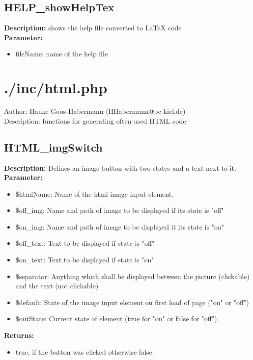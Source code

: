\subsection{HELP\_showHelpTex}
\textbf{Description:} shows the help file converted to LaTeX code\\
\textbf{Parameter:}
\begin{itemize}
\item fileName: name of the help file
\end{itemize}

\newpage\section{./inc/html.php}
 Author: Hauke Goos-Habermann (HHabermann@pc-kiel.de)\\
 Description: functions for generating often used HTML code\\

\subsection{HTML\_imgSwitch}
\textbf{Description:} Defines an image button with two states and a text next to it.\\
\textbf{Parameter:}
\begin{itemize}
\item \$htmlName: Name of the html image input element.
\item \$off\_img: Name and path of image to be displayed if its state is "off"
\item \$on\_img: Name and path of image to be displayed it its state is "on"
\item \$off\_text: Text to be displayed if state is "off"
\item \$on\_text: Text to be displayed if state is "on"
\item \$separator: Anything which shall be displayed between the picture (clickable) and the text (not clickable)
\item \$default: State of the image input element on first load of page ("on" or "off")
\item \$outState: Current state of element (true for "on" or false for "off").
\end{itemize}
\textbf{Returns:}
\begin{itemize}
\item true, if the button was clicked otherwise false.
\end{itemize}

